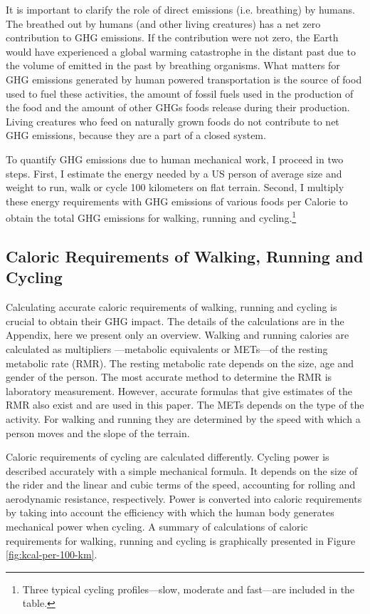 \documentclass{article}[12pt,letterpaper]
\begin{document}
It is important to clarify the role of direct \cadi emissions (i.e. breathing) by humans. The \cadi breathed out by humans (and other living creatures) has a net zero contribution to GHG emissions. If the contribution were not zero, the Earth would have experienced a global warming catastrophe in the distant past due to the volume of \cadi emitted in the past by breathing organisms. What matters for GHG emissions generated by human powered transportation is the source of food used to fuel these activities, the amount of fossil fuels used in the production of the food and the amount of other GHGs foods release during their production. Living creatures who feed on naturally grown foods do not contribute to net GHG emissions, because they are a part of a closed system.

To quantify GHG emissions due to human mechanical work, I proceed in two steps. First, I estimate the energy needed by a US person of average size and weight to run, walk or cycle 100 kilometers on flat terrain. Second, I multiply these energy requirements with GHG emissions of various foods per Calorie to obtain the total GHG emissions for walking, running and cycling.\footnote{Three typical cycling profiles---slow, moderate and fast---are included in the table.}

\subsection{Caloric Requirements of Walking, Running and Cycling}
Calculating accurate caloric requirements of walking, running and cycling is crucial to obtain their GHG impact. The details of the calculations are in the Appendix, here we present only an overview. Walking and running calories are calculated as multipliers ---metabolic equivalents or METs---of the resting metabolic rate (RMR). The resting metabolic rate depends on the size, age and gender of the person. The most accurate method to determine the RMR is laboratory measurement. However, accurate formulas that give estimates of the RMR also exist and are used in this paper. The METs depends on the type of the activity. For walking and running they are determined by the speed with which a person moves and the slope of the terrain.

Caloric requirements of cycling are calculated differently. Cycling power is described accurately with a simple mechanical formula. It depends on the size of the rider and the linear and cubic terms of the speed, accounting for rolling and aerodynamic resistance, respectively. Power is converted into caloric requirements by taking into account the efficiency with which the human body generates mechanical power when cycling. A summary of calculations of caloric requirements for walking, running and cycling is graphically presented in Figure \ref{fig:kcal-per-100-km}.
\end{document}
